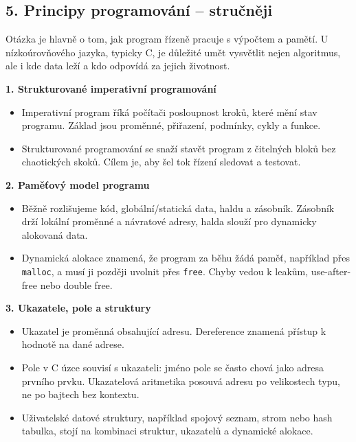 
\subsection*{5. Principy programování -- stručněji}
Otázka je hlavně o tom, jak program řízeně pracuje s výpočtem a pamětí. U nízkoúrovňového jazyka, typicky C, je důležité umět vysvětlit nejen algoritmus, ale i kde data leží a kdo odpovídá za jejich životnost.

\textbf{1. Strukturované imperativní programování}
\begin{itemize}
  \item Imperativní program říká počítači posloupnost kroků, které mění stav programu. Základ jsou proměnné, přiřazení, podmínky, cykly a funkce.
  \item Strukturované programování se snaží stavět program z čitelných bloků bez chaotických skoků. Cílem je, aby šel tok řízení sledovat a testovat.
\end{itemize}

\textbf{2. Paměťový model programu}
\begin{itemize}
  \item Běžně rozlišujeme kód, globální/statická data, haldu a zásobník. Zásobník drží lokální proměnné a návratové adresy, halda slouží pro dynamicky alokovaná data.
  \item Dynamická alokace znamená, že program za běhu žádá paměť, například přes \texttt{malloc}, a musí ji později uvolnit přes \texttt{free}. Chyby vedou k leakům, use-after-free nebo double free.
\end{itemize}

\textbf{3. Ukazatele, pole a struktury}
\begin{itemize}
  \item Ukazatel je proměnná obsahující adresu. Dereference znamená přístup k hodnotě na dané adrese.
  \item Pole v C úzce souvisí s ukazateli: jméno pole se často chová jako adresa prvního prvku. Ukazatelová aritmetika posouvá adresu po velikostech typu, ne po bajtech bez kontextu.
  \item Uživatelské datové struktury, například spojový seznam, strom nebo hash tabulka, stojí na kombinaci struktur, ukazatelů a dynamické alokace.
\end{itemize}


